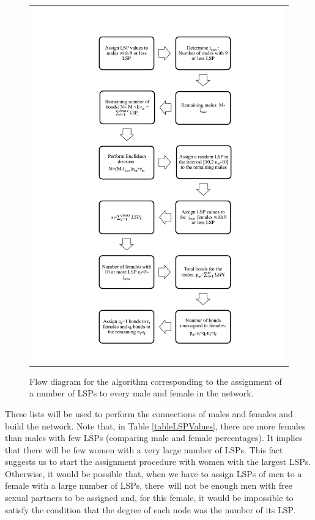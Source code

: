 \begin{figure}[H]
\centering
\begin{tabular}{c}
\includegraphics[width=\textwidth]{IMG/FluxDiagramI.pdf}
\end{tabular}
\caption{Flow diagram for the algorithm corresponding to the assignment of a number of LSPs to every male and female in the network.\label{flux1}}
\end{figure}

These lists will be used to perform the connections of males and females and build the network.
Note that, in Table \ref{tableLSPValues}, there are more females than males with few LSPs (comparing male and female percentages). It implies that there will be few women with a very large number of LSPs. This fact suggests us to start the assignment procedure with women with the largest LSPs. Otherwise, it would be possible that, when we have to assign LSPs of men to a female with a large number of LSPs, there~will not be enough men with free sexual partners to be assigned and, for this female, it would be impossible to satisfy the condition that the degree of each node was the number of its LSP. 

